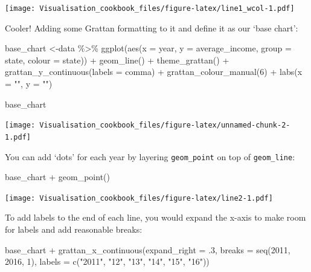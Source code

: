\documentclass[
]{book}
\newenvironment{Shaded}{\begin{snugshade}}{\end{snugshade}}
\newcommand{\AttributeTok}[1]{\textcolor[rgb]{0.77,0.63,0.00}{#1}}
\newcommand{\DecValTok}[1]{\textcolor[rgb]{0.00,0.00,0.81}{#1}}
\newcommand{\FunctionTok}[1]{\textcolor[rgb]{0.00,0.00,0.00}{#1}}
\newcommand{\NormalTok}[1]{#1}
\newcommand{\OtherTok}[1]{\textcolor[rgb]{0.56,0.35,0.01}{#1}}
\newcommand{\SpecialCharTok}[1]{\textcolor[rgb]{0.00,0.00,0.00}{#1}}
\newcommand{\StringTok}[1]{\textcolor[rgb]{0.31,0.60,0.02}{#1}}
\begin{document}
\texttt{[image: Visualisation\_cookbook\_files/figure-latex/line1\_wcol-1.pdf]}

Cooler! Adding some Grattan formatting to it and define it as our `base chart':

\begin{Shaded}
\begin{Highlighting}[]
\NormalTok{base\_chart }\OtherTok{\textless{}{-}}\NormalTok{data }\SpecialCharTok{\%\textgreater{}\%} 
  \FunctionTok{ggplot}\NormalTok{(}\FunctionTok{aes}\NormalTok{(}\AttributeTok{x =}\NormalTok{ year,}
             \AttributeTok{y =}\NormalTok{ average\_income,}
             \AttributeTok{group =}\NormalTok{ state,}
             \AttributeTok{colour =}\NormalTok{ state)) }\SpecialCharTok{+} 
  \FunctionTok{geom\_line}\NormalTok{() }\SpecialCharTok{+}
  \FunctionTok{theme\_grattan}\NormalTok{() }\SpecialCharTok{+} 
  \FunctionTok{grattan\_y\_continuous}\NormalTok{(}\AttributeTok{labels =}\NormalTok{ comma) }\SpecialCharTok{+} 
  \FunctionTok{grattan\_colour\_manual}\NormalTok{(}\DecValTok{6}\NormalTok{) }\SpecialCharTok{+}
  \FunctionTok{labs}\NormalTok{(}\AttributeTok{x =} \StringTok{""}\NormalTok{,}
       \AttributeTok{y =} \StringTok{""}\NormalTok{)}

\NormalTok{base\_chart}
\end{Highlighting}
\end{Shaded}

\texttt{[image: Visualisation\_cookbook\_files/figure-latex/unnamed-chunk-2-1.pdf]}

You can add `dots' for each year by layering \texttt{geom\_point} on top of \texttt{geom\_line}:

\begin{Shaded}
\begin{Highlighting}[]
\NormalTok{base\_chart }\SpecialCharTok{+}
  \FunctionTok{geom\_point}\NormalTok{()}
\end{Highlighting}
\end{Shaded}

\texttt{[image: Visualisation\_cookbook\_files/figure-latex/line2-1.pdf]}

To add labels to the end of each line, you would expand the x-axis to make room for labels and add reasonable breaks:

\begin{Shaded}
\begin{Highlighting}[]
\NormalTok{base\_chart }\SpecialCharTok{+}
  \FunctionTok{grattan\_x\_continuous}\NormalTok{(}\AttributeTok{expand\_right =}\NormalTok{ .}\DecValTok{3}\NormalTok{,}
                       \AttributeTok{breaks =} \FunctionTok{seq}\NormalTok{(}\DecValTok{2011}\NormalTok{, }\DecValTok{2016}\NormalTok{, }\DecValTok{1}\NormalTok{),}
                       \AttributeTok{labels =} \FunctionTok{c}\NormalTok{(}\StringTok{"2011"}\NormalTok{, }\StringTok{"12"}\NormalTok{, }\StringTok{"13"}\NormalTok{, }\StringTok{"14"}\NormalTok{, }\StringTok{"15"}\NormalTok{, }\StringTok{"16"}\NormalTok{)) }
\end{Highlighting}
\end{Shaded}
\end{document}
